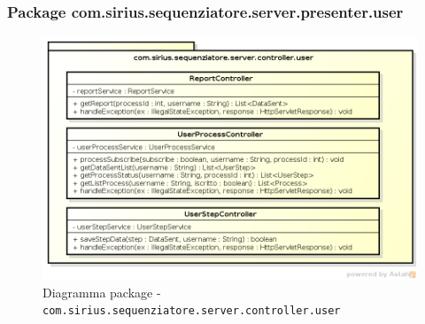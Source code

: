 \subsubsection{Package com.sirius.sequenziatore.server.presenter.user}
\begin{figure}[H] \centering \includegraphics[width=%
\textwidth]
{./classi/server/controlleruser.png} \caption{Diagramma package - \texttt{com.sirius.sequenziatore.server.controller.user}}
\end{figure}
